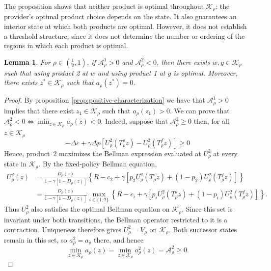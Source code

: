 \documentclass[11pt]{article}
\newtheorem{lemma}{Lemma}
\begin{document}
The proposition shows that neither product is optimal throughout $\mathcal K_\rho$: the provider's optimal product choice depends on the state. It also guarantees an interior state at which both products are optimal. However, it does not establish a threshold structure, since it does not determine the number or ordering of the regions in which each product is optimal.

\begin{lemma}
\label{prop:interior-indifference}
For $\rho\in(\frac12,1)$, if $\mathcal A_\rho^1>0$ and
$\mathcal A_\rho^2<0$, then there exists $w,y\in\mathcal K_\rho$ such that using product 2 at $w$ and using product 1 at $y$ is optimal. Moreover, there exists $z^*\in\mathcal K_\rho$ such that $a_\rho(z^*)=0$.
\end{lemma}

\begin{proof}
By proposition \ref{prop:positive-characterization} we have that $\mathcal A_\rho^1>0$ implies that there exist $z_1 \in \mathcal K_\rho$ such that $a_\rho(z_1)>0$. 
We can prove that $\mathcal A_\rho^2<0 \iff \min_{z\in\mathcal K_\rho} a_\rho(z) <0 $. Indeed, suppose that $\mathcal A_\rho^2\ge0$ then, for all $z \in \mathcal K_\rho$
\begin{equation}
    -\Delta c + \gamma \Delta p\left[U_\rho^2(T_\rho^s z)-U_\rho^2(T_\rho^f z)\right] \ge 0 
\end{equation}
Hence, product~2 maximizes the Bellman expression evaluated at
$U_\rho^2$ at every state in $\mathcal K_\rho$. By the fixed-policy
Bellman equation,
\begin{align*}
U_\rho^2(z)
&=\frac{D_\rho(z)}{1-\gamma[1-D_\rho(z)]}
\left\{R-c_2+\gamma\left[p_2U_\rho^2(T_\rho^s z)
+(1-p_2)U_\rho^2(T_\rho^f z)\right]\right\}\\
&=\frac{D_\rho(z)}{1-\gamma[1-D_\rho(z)]}
\max_{i\in\{1,2\}}
\left\{R-c_i+\gamma\left[p_iU_\rho^2(T_\rho^s z)
+(1-p_i)U_\rho^2(T_\rho^f z)\right]\right\}.
\end{align*}
Thus $U_\rho^2$ also satisfies the optimal Bellman equation on
$\mathcal K_\rho$. Since this set is invariant under both transitions,
the Bellman operator restricted to it is a contraction. Uniqueness
therefore gives $U_\rho^2=V_\rho$ on $\mathcal K_\rho$.
Both successor states remain in this set, so $a_\rho^2=a_\rho$ there,
and hence
\begin{equation*}
\min_{z\in\mathcal K_\rho}a_\rho(z)
=\min_{z\in\mathcal K_\rho}a_\rho^2(z)
=\mathcal A_\rho^2\geq0.
\end{equation*}


\end{proof}
\end{document}
